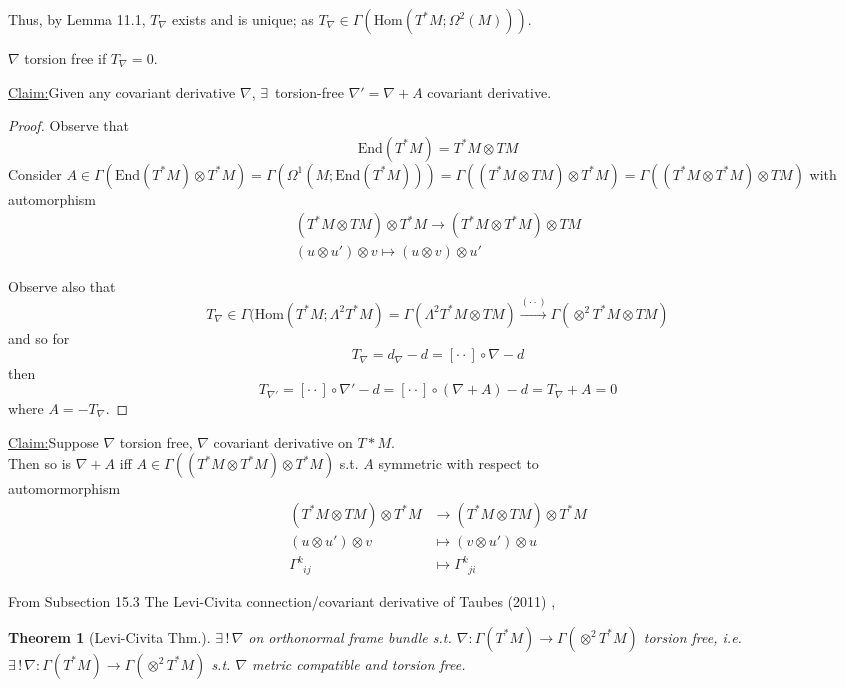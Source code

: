 \documentclass[10pt, twoside]{amsart}
\newtheorem{theorem}{Theorem}
\newenvironment{claim}[1]{\par\noindent\underline{Claim:}\space#1}{}
\begin{document}
\begin{multicols*}{2}
Thus, by Lemma 11.1, $T_{\nabla}$ exists and is unique; as $T_{\nabla} \in \Gamma(\text{Hom}(T^*M; \Omega^2(M)))$.  

$\nabla$ torsion free if $T_{\nabla}=0$.  

\begin{claim}
  Given any covariant derivative $\nabla$, $\exists \, $ torsion-free $\nabla' = \nabla +A$ covariant derivative.
\end{claim}

\begin{proof}
  Observe that 
\[
\text{End}(T^*M) = T^*M \otimes TM
\]
Consider $A \in \Gamma(\text{End}(T^*M) \otimes T^*M) = \Gamma(\Omega^1(M;\text{End}(T^*M))) = \Gamma((T^*M\otimes TM) \otimes T^*M) = \Gamma((T^*M \otimes T^*M)\otimes TM)$ with automorphism
\[
\begin{aligned}
  (T^*M \otimes TM) \otimes T^*M \to (T^*M \otimes T^*M) \otimes TM \\
  (u\otimes u') \otimes v \mapsto (u\otimes v)\otimes u'
\end{aligned}
\]

Observe also that 
\[
T_{\nabla} \in \Gamma(\text{Hom}(T^*M; \Lambda^2T^*M) = \Gamma(\Lambda^2 T^*M \otimes TM) \xrightarrow{ ( \cdot \cdot ) } \Gamma(\otimes^2T^*M\otimes TM)
\]
and so for 
\[
T_{\nabla} = d_{\nabla} - d = [\cdot \cdot ] \circ \nabla - d
\]
then
\[
T_{\nabla'} = [\cdot \cdot ] \circ \nabla' - d = [\cdot \cdot ] \circ (\nabla + A) - d  = T_{\nabla} + A = 0 
\]
where $A = -T_{\nabla}$.  
\end{proof}

\begin{claim}
Suppose $\nabla$ torsion free, $\nabla $ covariant derivative on $T*M$.   \\
Then so is $\nabla + A$ iff $A\in \Gamma((T^*M\otimes T^*M)\otimes T^*M)$ s.t. $A$ symmetric with respect to \\
automormorphism
\[
\begin{aligned}
  (T^*M\otimes TM) \otimes T^*M & \to (T^*M \otimes TM) \otimes T^*M \\ 
  (u\otimes u')\otimes v & \mapsto (v\otimes u') \otimes u \\ 
  \Gamma^k_{ \; \; ij} & \mapsto \Gamma^k_{ \; \; ji } 
\end{aligned}
\]
\end{claim}

From Subsection 15.3 The Levi-Civita connection/covariant derivative of  Taubes (2011) \cite{CTaubes2011}, 
\begin{theorem}[Levi-Civita Thm.]
  $\exists \, ! \, \nabla$ on orthonormal frame bundle s.t. $\nabla : \Gamma(T^*M) \to \Gamma(\otimes^2T^*M)$ torsion free, i.e. \\
$\exists \, ! \, \nabla : \Gamma(T^*M) \to \Gamma(\otimes^2T^*M)$ s.t. $\nabla $ metric compatible and torsion free.
\end{theorem}


\end{multicols*}
\end{document}
